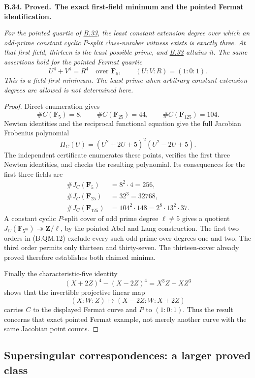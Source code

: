 \documentclass[11pt,a4paper]{article}
\newenvironment{claim}[3]{\par\medskip\noindent\hypertarget{#1}{\textbf{#1. #2.}}\ \textbf{#3.}\par\nopagebreak\smallskip\begingroup\itshape}{\endgroup\par\smallskip}
\newcommand{\statementref}[1]{\hyperlink{#1}{#1}}
\begin{document}
\begin{claim}{B.34}{Proved}{The exact first-field minimum and the pointed Fermat identification}
For the pointed quartic of \statementref{B.33}, the least
constant extension degree over which an odd-prime constant
cyclic $P$-split class-number witness exists is exactly three.
At that first field, thirteen is the least possible prime,
and \statementref{B.33} attains it. The same assertions hold
for the pointed Fermat quartic
\[
       U^4+V^4=R^4\quad\text{over }\mathbf F_5,
                   \qquad (U:V:R)=(1:0:1).
\]
This is a field-first minimum. The least prime when arbitrary
constant extension degrees are allowed is not determined here.
\end{claim}
\begin{proof}
Direct enumeration gives
\[
 \#C(\mathbf F_5)=8,\qquad
 \#C(\mathbf F_{25})=44,\qquad
 \#C(\mathbf F_{125})=104.
\]
Newton identities and the reciprocal functional equation
give the full Jacobian Frobenius polynomial
\[
          H_C(U)=(U^2+2U+5)^2(U^2-2U+5).                       \tag{B.QM.11}
\]
The independent certificate enumerates these points, verifies
the first three Newton identities, and checks the resulting
polynomial. Its consequences for the first three fields are
\[
\begin{split}
 \#J_C(\mathbf F_5)&=8^2\cdot4=256,\\
 \#J_C(\mathbf F_{25})&=32^3=32768,\\
 \#J_C(\mathbf F_{125})&=104^2\cdot148
                         =2^8\cdot13^2\cdot37.
\end{split}                                                    \tag{B.QM.12}
\]
A constant cyclic $P$-split cover of odd prime degree
$\ell\ne5$ gives a quotient $J_C(\mathbf F_{5^m})\twoheadrightarrow
\mathbf Z/\ell$, by the pointed Abel and Lang construction.
The first two orders in (B.QM.12) exclude every such odd prime
over degrees one and two. The third order permits only
thirteen and thirty-seven. The thirteen-cover already proved
therefore establishes both claimed minima.

Finally the characteristic-five identity
\[
       (X+2Z)^4-(X-2Z)^4=X^3Z-XZ^3
\]
shows that the invertible projective linear map
\[
       (X:W:Z)\longmapsto(X-2Z:W:X+2Z)
\]
carries $C$ to the displayed Fermat curve and $P$ to
$(1:0:1)$. Thus the result concerns that exact pointed
Fermat example, not merely another curve with the same
Jacobian point counts.
\end{proof}


\subsection{Supersingular correspondences: a larger proved class}
\end{document}
